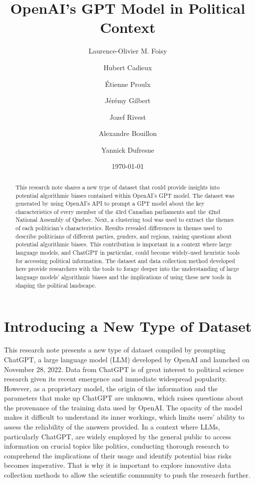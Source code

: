 \documentclass{article}
\title{OpenAI's GPT Model in Political Context}
\author{
  Laurence-Olivier M. Foisy
  \and
  Hubert Cadieux
  \and
  Étienne Proulx
  \and
  Jérémy Gilbert
  \and
  Jozef Rivest
  \and
  Alexandre Bouillon
  \and
  Yannick Dufresne
}
\date{\today}
\begin{document}
\maketitle

\begin{abstract}
   This research note shares a new type of dataset that could provide insights into potential algorithmic biases contained within OpenAI's GPT model. The dataset was generated by using OpenAI's API to prompt a GPT model about the key characteristics of every member of the 43rd Canadian parliaments and the 42nd National Assembly of Quebec. Next, a clustering tool was used to extract the themes of each politician's characteristics. Results revealed differences in themes used to describe politicians of different parties, genders, and regions, raising questions about potential algorithmic biases. This contribution is important in a context where large language models, and ChatGPT in particular, could become widely-used heuristic tools for accessing political information. The dataset and data collection method developed here provide researchers with the tools to forage deeper into the understanding of large language models' algorithmic biases and the implications of using these new tools in shaping the political landscape.  
\end{abstract}

\section{Introducing a New Type of Dataset}

This research note presents a new type of dataset compiled by prompting ChatGPT, a large language model (LLM) developed by OpenAI and launched on November 28, 2022. Data from ChatGPT is of great interest to political science research given its recent emergence and immediate widespread popularity. However, as a proprietary model, the origin of the information and the parameters that make up ChatGPT are unknown, which raises questions about the provenance of the training data used by OpenAI. The opacity of the model makes it difficult to understand its inner workings, which limits users' ability to assess the reliability of the answers provided. In a context where LLMs, particularly ChatGPT, are widely employed by the general public to access information on crucial topics like politics, conducting thorough research to comprehend the implications of their usage and identify potential bias risks becomes imperative. That is why it is important to explore innovative data collection methods to allow the scientific community to push the research further.
\end{document}
